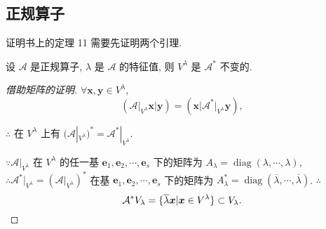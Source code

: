 \documentclass{ctexart}
\begin{document}
\subsection{正规算子}
证明书上的定理 11 需要先证明两个引理.
\begin{lemma}\label{l3.2}
    设 $\mathcal{A}$ 是正规算子, $\lambda$ 是 $\mathcal{A}$ 的特征值, 则 $V^\lambda$ 是 $\mathcal{A}^*$ 不变的.
\end{lemma}
\begin{proof}[借助矩阵的证明]
    $\forall\boldsymbol{x},\boldsymbol{y}\in V^\lambda$,
    \[\left(\mathcal{A}|_{V^\lambda}\boldsymbol{x}\Big|\boldsymbol{y}\right)=\left(\boldsymbol{x}\Big|\mathcal{A}^*|_{V^\lambda}\boldsymbol{y}\right),\]

    $\therefore$ 在 $V^\lambda$ 上有 $(\mathcal{A}|_{V^\lambda})^*=\mathcal{A}^*|_{V^\lambda}$.

    $\because\mathcal{A}|_{V^\lambda}$ 在 $V^\lambda$ 的任一基 $\boldsymbol{e}_1,\boldsymbol{e}_2,\cdots,\boldsymbol{e}_s$ 下的矩阵为 $A_\lambda=\operatorname{diag}(\lambda,\cdots,\lambda)$, $\therefore\mathcal{A}^*|_{V^\lambda}=(\mathcal{A}|_{V^\lambda})^*$ 在基 $\boldsymbol{e}_1,\boldsymbol{e}_2,\cdots,\boldsymbol{e}_s$ 下的矩阵为 $A_\lambda^*=\operatorname{diag}(\overline{\lambda},\cdots,\overline{\lambda})$. $\therefore$
    \[\mathcal{A}^*V_\lambda=\{\overline{\lambda}\boldsymbol{x}|\boldsymbol{x}\in V^\lambda\}\subset V_\lambda.\qedhere\]
\end{proof}
\end{document}
